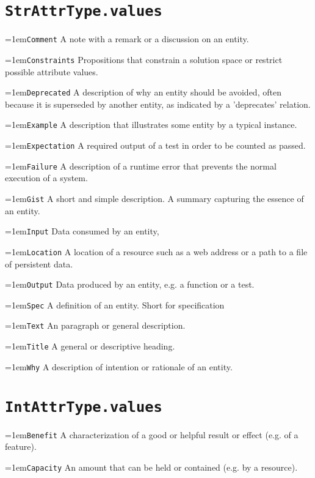 \documentclass[a4paper,oneside]{article}
\newcommand\Concept[2]{\hangindent=1em\lstinline+#1+ #2}
\begin{document}
\begin{multicols*}{4}
\raggedright


\section*{\texttt{StrAttrType.values}}
\Concept{Comment}{A note with a remark or a discussion on an entity.}

\Concept{Constraints}{Propositions that constrain a solution space or restrict possible attribute values.}

\Concept{Deprecated}{A description of why an entity should be avoided, often because it is superseded by another entity, as indicated by a 'deprecates' relation.}

\Concept{Example}{A description that illustrates some entity by a typical instance.}

\Concept{Expectation}{A required output of a test in order to be counted as passed.}

\Concept{Failure}{A description of a runtime error that prevents the normal execution of a system.}

\Concept{Gist}{A short and simple description. A summary capturing the essence of an entity.}

\Concept{Input}{Data consumed by an entity, }

\Concept{Location}{A location of a resource such as a web address or a path to a file of persistent data.}

\Concept{Output}{Data produced by an entity, e.g. a function or a test.}

\Concept{Spec}{A definition of an entity. Short for specification}

\Concept{Text}{An paragraph or general description.}

\Concept{Title}{A general or descriptive heading.}

\Concept{Why}{A description of intention or rationale of an entity.}

\section*{\texttt{IntAttrType.values}}
\Concept{Benefit}{A characterization of a good or helpful result or effect (e.g. of a feature).}

\Concept{Capacity}{An amount that can be held or contained (e.g. by a resource).}


\end{multicols*}
\end{document}
